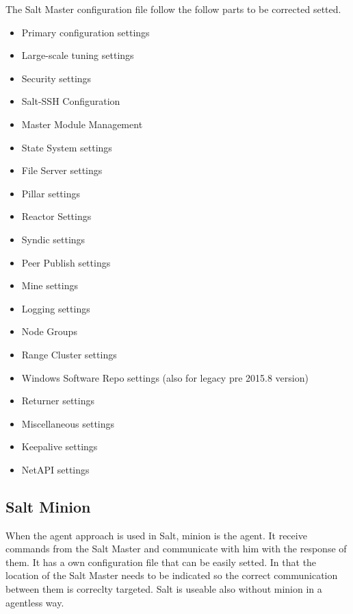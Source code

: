 \documentclass[12pt,a4paper,openright,twoside]{book}
\begin{document}
The Salt Master configuration file follow the follow parts to be corrected setted.
\begin{itemize}
    \item Primary configuration settings
    \item Large-scale tuning settings
    \item Security settings
    \item Salt-SSH Configuration
    \item Master Module Management
    \item State System settings
    \item File Server settings
    \item Pillar settings
    \item Reactor Settings
    \item Syndic settings
    \item Peer Publish settings
    \item Mine settings
    \item Logging settings
    \item Node Groups
    \item Range Cluster settings
    \item Windows Software Repo settings (also for legacy pre 2015.8 version)
    \item Returner settings
    \item Miscellaneous settings
    \item Keepalive settings
    \item NetAPI settings
    \end{itemize}


\subsection{Salt Minion}
When the agent approach is used in Salt, minion is the agent. It receive commands from the Salt Master and communicate with him with the response of them. It has a own configuration file that can be easily setted. In that the location of the Salt Master needs to be indicated so the correct communication between them is correclty targeted.
Salt is useable also without minion in a agentless way.
\end{document}
